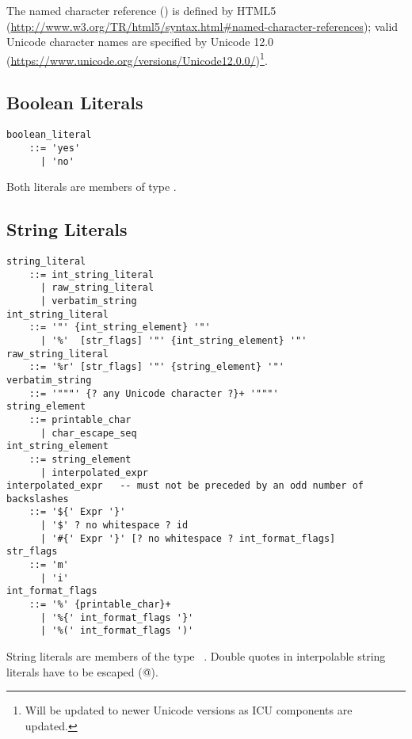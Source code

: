 The named character reference () is defined by HTML5 (\url{http://www.w3.org/TR/html5/syntax.html#named-character-references}); valid Unicode character names are specified by Unicode 12.0 (\url{https://www.unicode.org/versions/Unicode12.0.0/})\footnote{Will be updated to newer Unicode versions as ICU components are updated.}. 





\subsection{Boolean Literals}
\label{sec:booleanliterals}

\syntax\begin{lstlisting}
boolean_literal 
    ::= 'yes' 
      | 'no'
\end{lstlisting}

Both literals are members of type \lstinline@Boolean@. 





\subsection{String Literals}
\label{sec:stringliterals}

\syntax\begin{lstlisting}[mathescape=false,deletekeywords={no}]
string_literal 
    ::= int_string_literal
      | raw_string_literal
      | verbatim_string
int_string_literal 
    ::= '"' {int_string_element} '"'
      | '%'  [str_flags] '"' {int_string_element} '"'
raw_string_literal 
    ::= '%r' [str_flags] '"' {string_element} '"'
verbatim_string
    ::= '"""' {? any Unicode character ?}+ '"""'
string_element
    ::= printable_char 
      | char_escape_seq
int_string_element 
    ::= string_element 
      | interpolated_expr
interpolated_expr   -- must not be preceded by an odd number of backslashes
    ::= '${' Expr '}'
      | '$' ? no whitespace ? id
      | '#{' Expr '}' [? no whitespace ? int_format_flags]
str_flags 
    ::= 'm' 
      | 'i'
int_format_flags
    ::= '%' {printable_char}+
      | '%{' int_format_flags '}' 
      | '%(' int_format_flags ')' 
\end{lstlisting}

String literals are members of the type ~\lstinline@String@. Double quotes in interpolable string literals have to be escaped (\lstinline@\"@).

